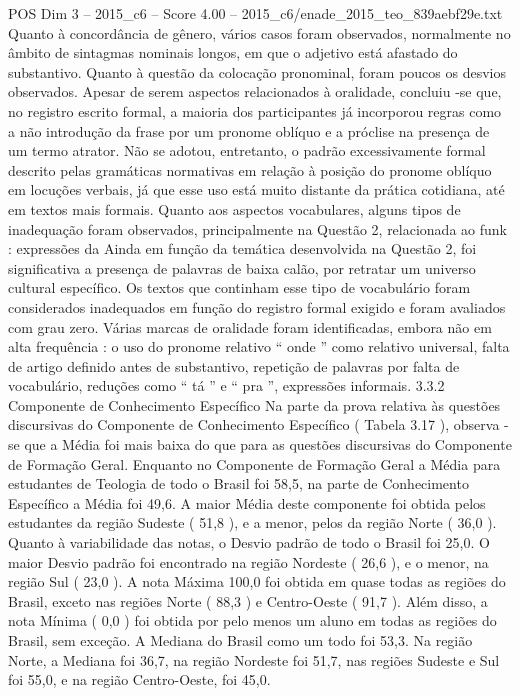 \begin{textsample}{POS Dim 3 – 2015\_c6 – Score 4.00 – 2015\_c6/enade\_2015\_teo\_839aebf29e.txt}
Quanto à concordância de gênero, vários casos foram observados, normalmente no âmbito de sintagmas nominais longos, em que o adjetivo está afastado do substantivo.
Quanto à questão da colocação pronominal, foram poucos os desvios observados.
Apesar de serem aspectos relacionados à oralidade, concluiu -se que, no registro escrito formal, a maioria dos participantes já incorporou regras como a não introdução da frase por um pronome oblíquo e a próclise na presença de um termo atrator.
Não se adotou, entretanto, o padrão excessivamente formal descrito pelas gramáticas normativas em relação à posição do pronome oblíquo em locuções verbais, já que esse uso está muito distante da prática cotidiana, até em textos mais formais.
Quanto aos aspectos vocabulares, alguns tipos de inadequação foram observados, principalmente na Questão 2, relacionada ao funk : expressões da Ainda em função da temática desenvolvida na Questão 2, foi significativa a presença de palavras de baixa calão, por retratar um universo cultural específico.
Os textos que continham esse tipo de vocabulário foram considerados inadequados em função do registro formal exigido e foram avaliados com grau zero.
Várias marcas de oralidade foram identificadas, embora não em alta frequência : o uso do pronome relativo “ onde ” como relativo universal, falta de artigo definido antes de substantivo, repetição de palavras por falta de vocabulário, reduções como “ tá ” e “ pra ”, expressões informais. 3.3.2 Componente de Conhecimento Específico Na parte da prova relativa às questões discursivas do Componente de Conhecimento Específico ( Tabela 3.17 ), observa -se que a Média foi mais baixa do que para as questões discursivas do Componente de Formação Geral.
Enquanto no Componente de Formação Geral a Média para estudantes de Teologia de todo o Brasil foi 58,5, na parte de Conhecimento Específico a Média foi 49,6.
A maior Média deste componente foi obtida pelos estudantes da região Sudeste ( 51,8 ), e a menor, pelos da região Norte ( 36,0 ).
Quanto à variabilidade das notas, o Desvio padrão de todo o Brasil foi 25,0.
O maior Desvio padrão foi encontrado na região Nordeste ( 26,6 ), e o menor, na região Sul ( 23,0 ).
A nota Máxima 100,0 foi obtida em quase todas as regiões do Brasil, exceto nas regiões Norte ( 88,3 ) e Centro-Oeste ( 91,7 ).
Além disso, a nota Mínima ( 0,0 ) foi obtida por pelo menos um aluno em todas as regiões do Brasil, sem exceção.
A Mediana do Brasil como um todo foi 53,3.
Na região Norte, a Mediana foi 36,7, na região Nordeste foi 51,7, nas regiões Sudeste e Sul foi 55,0, e na região Centro-Oeste, foi 45,0.

\end{textsample}

